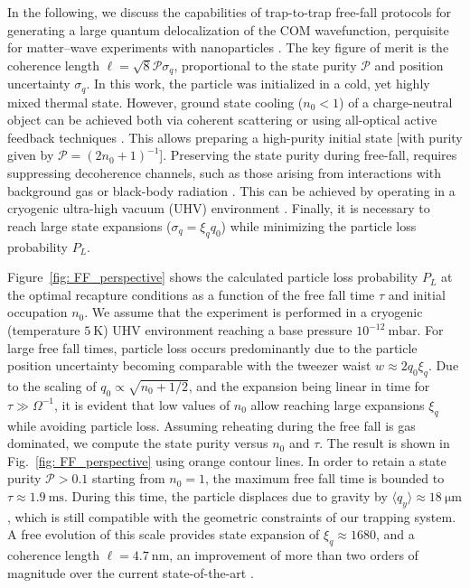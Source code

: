 \documentclass[twocolumn,preprintnumbers,superscriptaddress,amsmath,amssymb,aps,pra,10pt]{revtex4-1}
\newcommand{\<}{\langle}
\renewcommand{\>}{\rangle}
\renewcommand{\>}{\rangle}
\begin{document}
In the following, we discuss the capabilities of trap-to-trap free-fall protocols for generating a large quantum delocalization of the COM wavefunction, perquisite for matter–wave experiments with nanoparticles \cite{Neumeier2024}.
%
The key figure of merit is the coherence length $\ell=\sqrt{8}\mathcal{P}\sigma_q$, proportional to the state purity $\mathcal{P}$ and position uncertainty $\sigma_q$.
%
In this work, the particle was initialized in a cold, yet highly mixed thermal state.
%
However, ground state cooling ($n_0<1$) of a charge-neutral object can be achieved both via coherent scattering  \cite{Delic2020,Piotrowski2023} or using all-optical active feedback techniques \cite{kamba2022optical}. 
%
This allows preparing a high-purity initial state [with purity given by $\mathcal{P}=(2n_0+1)^{-1}$].
%
Preserving the state purity during free-fall, requires suppressing decoherence channels, such as those arising from interactions with background gas or black-body radiation \cite{Neumeier2024}.
%
This can be achieved by operating in a cryogenic ultra-high vacuum (UHV) environment \cite{Tebbenjohanns2019}.
%
Finally, it is necessary to reach large state expansions ($\sigma_q=\xi_q q_0$) while minimizing the particle loss probability $P_L$.

Figure~\ref{fig: FF_perspective} shows the calculated particle loss probability $P_L$ at the optimal recapture conditions as a function of the free fall time $\tau$ and initial occupation $n_0$.
%
We assume that the experiment is performed in a cryogenic (temperature $5~\mathrm{K}$) UHV environment reaching a base pressure $10^{-12}~\mathrm{mbar}$.
%
For large free fall times, particle loss occurs predominantly due to the particle position uncertainty becoming comparable with the tweezer waist $w \approx 2q_0\xi_q$. 
%
Due to the scaling of $q_0\propto \sqrt{n_0+1/2}$, and the expansion being linear in time for $\tau \gg \Omega^{-1}$, it is evident that low values of $n_0$ allow reaching large expansions $\xi_q$ while avoiding particle loss.
%
Assuming reheating during the free fall is gas dominated, we compute the state purity versus $n_0$ and $\tau$.
%
The result is shown in Fig.~\ref{fig: FF_perspective} using orange contour lines.
%
In order to retain a state purity $\mathcal{P}>0.1$ starting from $n_0=1$, the maximum free fall time is bounded to $\tau\approx 1.9~\text{ms}$.
%
During this time, the particle displaces due to gravity by $\langle q_y \rangle\approx 18~\mathrm{\mu m}$, which is still compatible with the geometric constraints of our trapping system.
%
A free evolution of this scale provides state expansion of $\xi_q\approx 1680$, and a coherence length $\ell=4.7~\mathrm{nm}$, an improvement of more than two orders of magnitude over the current state-of-the-art \cite{Rossi2024,Kamba2025}.
\end{document}

